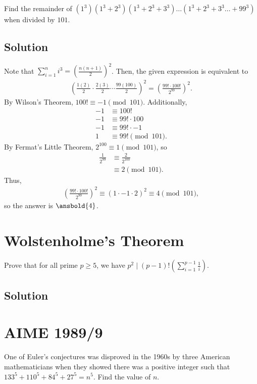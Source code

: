 \documentclass[mast]{lucky}
\begin{document}
Find the remainder of $(1^3)(1^3+2^3)(1^3+2^3+3^3)\dots(1^3+2^3+3^3\dots+99^3)$ when divided by $101.$

\subsection{Solution}

Note that $\sum_{i=1}^{n} i^3 = \left(\frac{n(n + 1)}{2}\right)^2$. Then, the given expression is equivalent to 
\begin{align*}
\left(\frac{1(2)}{2} \cdot \frac{2(3)}{2} \cdots \frac{99(100)}{2}\right)^2 = \left(\frac{99! \cdot 100!}{2^{99}}\right)^2.
\end{align*}
By Wilson's Theorem, $100! \equiv -1 \pmod{101}$. Additionally,
\begin{align*}
-1 &\equiv 100! \\
-1 &\equiv 99! \cdot 100 \\
-1 &\equiv 99! \cdot -1 \\
1 &\equiv 99! \pmod{101}.
\end{align*}
By Fermat's Little Theorem, $2^{100} \equiv 1 \pmod{101}$, so
\begin{align*}
\frac{1}{2^{99}} &\equiv \frac{2}{2^{100}} \\
&\equiv 2 \pmod{101}.
\end{align*}
Thus, 
\begin{align*}
\left(\frac{99! \cdot 100!}{2^{99}}\right)^2 \equiv (1 \cdot -1 \cdot 2)^2 \equiv 4 \pmod{101},
\end{align*}
so the answer is $\ansbold{4}$.

\pagebreak\section{Wolstenholme's Theorem}

Prove that for all prime $p\ge5$, we have $p^2\mid (p-1)!\left(\sum\limits_{i=1}^{p-1}\frac1{i}\right)$.

\subsection{Solution}

\pagebreak\section{AIME 1989/9}

One of Euler's conjectures was disproved in the 1960s by three American mathematicians when they showed there was a positive integer such that $133^5+110^5+84^5+27^5=n^{5}$. Find the value of $n$.
\end{document}
